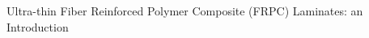 \documentclass[final]{beamer}
\begin{document}
\begin{frame}
\begin{center}
\begin{minipage}{\textwidth}
\begin{block}{\rule[-0.6ex]{0pt}{50pt}\centering\LARGE Ultra-thin Fiber Reinforced Polymer Composite (FRPC) Laminates: an Introduction}
\begin{columns}
\begin{column}{0.325\textwidth}
\begin{center}
\begin{figure}[!h]
     \\[50pt]
\end{figure}
     \end{center}
\end{column}
\begin{column}{0.3\textwidth}  %

\end{column}
\end{columns}
\end{block}
\end{minipage}
\end{center}
\end{frame}
\end{document}
